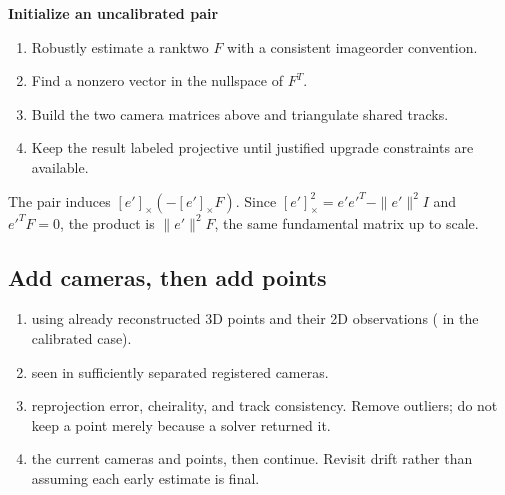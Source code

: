 \documentclass[letterpaper,11pt,english,openany,oneside]{jupyterBook}
\begin{document}
\begin{TextbookBox}
\textbf{Initialize an uncalibrated pair}\par\smallskip
\begin{enumerate}
%
\item {}
\sphinxAtStartPar
Robustly estimate a rank\sphinxhyphen{}two \(F\) with a consistent image\sphinxhyphen{}order convention.

\item {}
\sphinxAtStartPar
Find a nonzero vector in the nullspace of \(F^T\).

\item {}
\sphinxAtStartPar
Build the two camera matrices above and triangulate shared tracks.

\item {}
\sphinxAtStartPar
Keep the result labeled projective until justified upgrade constraints are available.

\end{enumerate}

\end{TextbookBox}

\sphinxAtStartPar
{} The pair induces \([e']_\times(-[e']_\times F)\). Since \([e']_\times^2=e'e'^T-\|e'\|^2I\) and \(e'^TF=0\), the product is \(\|e'\|^2F\), the same fundamental matrix up to scale.


\subsection{Add cameras, then add points}
\label{\detokenize{lectures/lecture06/pipeline:add-cameras-then-add-points}}\begin{enumerate}
%
\item {}
\sphinxAtStartPar
{} using already reconstructed 3D points and their 2D observations ( in the calibrated case).

\item {}
\sphinxAtStartPar
{} seen in sufficiently separated registered cameras.

\item {}
\sphinxAtStartPar
{} reprojection error, cheirality, and track consistency. Remove outliers; do not keep a point merely because a solver returned it.

\item {}
\sphinxAtStartPar
{} the current cameras and points, then continue. Revisit drift rather than assuming each early estimate is final.

\end{enumerate}
\end{document}
